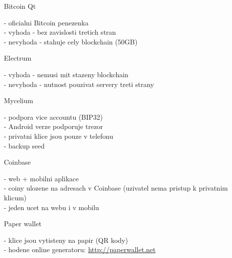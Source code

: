 \documentclass{beamer}
\begin{document}
\begin{frame}

    {\LARGE Bitcoin Qt}\\

    \vspace{5mm}

    - oficialni Bitcoin penezenka\\
    - vyhoda - bez zavislosti tretich stran\\
    - nevyhoda - stahuje cely blockchain (50GB)\\

    \vspace{10mm}

    {\LARGE Electrum}\\

    \vspace{5mm}

    - vyhoda - nemusi mit stazeny blockchain\\
    - nevyhoda - nutnost pouzivat servery treti strany\\

\end{frame}

\begin{frame}

    {\LARGE Mycelium}\\

    \vspace{5mm}

    - podpora vice accountu (BIP32)\\
    - Android verze podporuje trezor\\
    - privatni klice jsou pouze v telefonu\\
    - backup seed\\

    \vspace{10mm}

    {\LARGE Coinbase}\\

    \vspace{5mm}

    - web + mobilni aplikace\\
    - coiny ulozene na adresach v Coinbase (uzivatel nema pristup k privatnim klicum)\\
    - jeden ucet na webu i v mobilu\\

\end{frame}

\begin{frame}

    {\LARGE Paper wallet}\\

    \vspace{5mm}

    - klice jsou vytisteny na papir (QR kody)\\
    - hodene online generatoru: \url{http://paperwallet.net}\\

\end{frame}
\end{document}
